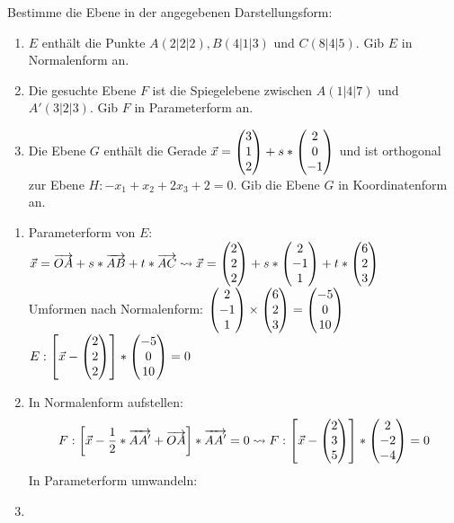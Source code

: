 Bestimme die Ebene in der angegebenen Darstellungsform:
\begin{enumerate}
	\item $E$ enthält die Punkte $A(2|2|2), B(4|1|3)$ und $C(8|4|5)$. Gib $E$ in Normalenform an. %
	\item Die gesuchte Ebene $F$ ist die Spiegelebene zwischen $A(1|4|7)$ und $A'(3|2|3)$. Gib $F$ in Parameterform an. %
	\item Die Ebene $G$ enthält die Gerade $\vec x = \begin{pmatrix} 3\\1\\2 \end{pmatrix}+s*\begin{pmatrix} 2\\0\\-1 \end{pmatrix}$ und ist orthogonal zur Ebene $H:-x_1+x_2+2x_3+2=0$. Gib die Ebene $G$ in Koordinatenform an. %
\end{enumerate}
\begin{lsg}{}
	\begin{enumerate}
		\item Parameterform von $E$: $\vec{x}=\overrightarrow{OA}+s*\overrightarrow{AB}+t*\overrightarrow{AC}\rightsquigarrow \vec{x}=\begin{pmatrix} 2\\2\\2 \end{pmatrix}+s*\begin{pmatrix} 2\\-1\\1 \end{pmatrix}+t*\begin{pmatrix} 6\\2\\3 \end{pmatrix}$\\
		Umformen nach Normalenform: $\begin{pmatrix} 2\\-1\\1 \end{pmatrix}\times \begin{pmatrix} 6\\2\\3 \end{pmatrix}=\begin{pmatrix} -5\\0\\10 \end{pmatrix}$\\
		$E:\left[\vec{x}-\begin{pmatrix} 2\\2\\2 \end{pmatrix}\right]*\begin{pmatrix} -5\\0\\10 \end{pmatrix}=0$
		\item In Normalenform aufstellen:
		\begin{equation*}
			F: \left[\vec x - \frac{1}{2}*\overrightarrow{AA'}+\overrightarrow{OA}\right]*\overrightarrow{AA'}=0\rightsquigarrow F: \left[\vec x - \begin{pmatrix} 2\\3\\5 \end{pmatrix}\right]*\begin{pmatrix} 2\\-2\\-4 \end{pmatrix}=0
		\end{equation*}
		In Parameterform umwandeln:
		\item
	\end{enumerate}
\end{lsg}




